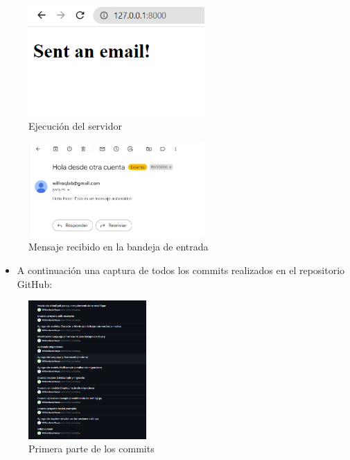 \documentclass{article}
\begin{document}
        \begin{figure}[H]
        \centering
        \includegraphics[width=0.6\textwidth]{img/sentemail.png}
        \caption*{Ejecución del servidor}
        \end{figure}
        \vspace{1cm}
        \begin{figure}[H]
        \centering
        \includegraphics[width=0.6\textwidth]{img/viewemail.png}
        \caption*{Mensaje recibido en la bandeja de entrada}
        \end{figure}
        \vspace{2cm}
        \begin{itemize}	
		\item A continuación una captura de todos los commits realizados en el repositorio GitHub:
        \end{itemize}
        \vspace{0.5cm}
        \begin{figure}[H]
        \centering
        \includegraphics[width=0.4\textwidth]{img/commits01.png}
        \caption*{Primera parte de los commits}
        \end{figure}
\end{document}
